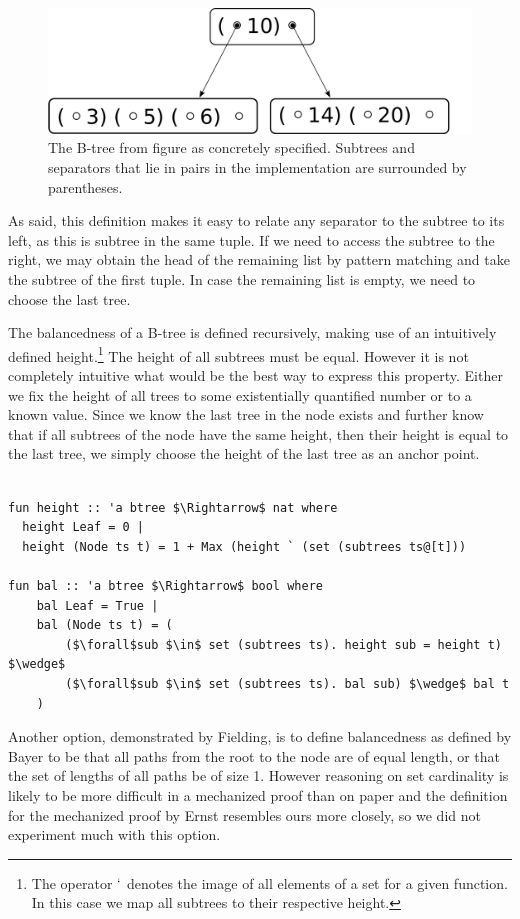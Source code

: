 \begin{figure}
    \centering
    \includegraphics[width=0.5\linewidth]{figures/btree-basic.pdf}
    \caption[Visualization of the implementation choice for B-Trees]
    {The B-tree from figure  as concretely specified.
    Subtrees and separators that lie in pairs in the implementation are surrounded by parentheses.}
    \label{fig:btree-basic}
\end{figure}


As said, this definition makes it easy to relate any separator
to the subtree to its left, as this is subtree in the same tuple.
If we need to access the subtree to the right,
we may obtain the head of the remaining list by pattern matching
and take the subtree of the first tuple.
In case the remaining list is empty,
we need to choose the last tree.

The balancedness of a B-tree is defined recursively, making use
of an intuitively defined height.\footnote{
    The operator $`$ denotes the image of all elements of a set for a given function.
    In this case we map all subtrees to their respective height.
}
The height of all subtrees must be equal.
However it is not completely intuitive
what would be the best way to express this property.
Either we fix the height of all trees
to some existentially quantified number or to a known value.
Since we know the last tree in the node exists and further
know that if all subtrees of the node have the same height,
then their height is equal to the last tree,
we simply choose the height of the last tree as an anchor point.


\begin{lstlisting}[mathescape=true, language=Isabelle]

fun height :: 'a btree $\Rightarrow$ nat where
  height Leaf = 0 |
  height (Node ts t) = 1 + Max (height ` (set (subtrees ts@[t]))

fun bal :: 'a btree $\Rightarrow$ bool where
    bal Leaf = True |
    bal (Node ts t) = (
        ($\forall$sub $\in$ set (subtrees ts). height sub = height t) $\wedge$
        ($\forall$sub $\in$ set (subtrees ts). bal sub) $\wedge$ bal t
    )
\end{lstlisting}

Another option, demonstrated by Fielding, is
to define balancedness as defined by Bayer
to be that all paths from the root to the node are of equal length,
or that the set of lengths of all paths be of size 1.
However reasoning on set cardinality is likely to be more difficult
in a mechanized proof than on paper
and the definition for the mechanized proof by Ernst resembles
ours more closely, so we did not experiment much with this option.

